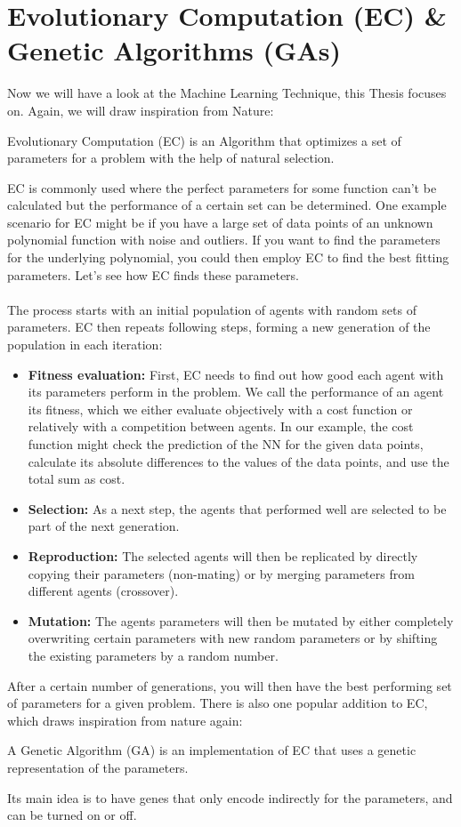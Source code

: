 \documentclass[11pt]{report}
\newcommand{\mydeflabel}{}
\newenvironment{mydef}[1]
 {\renewcommand\mydeflabel{#1}\begin{mydefinner}}
 {\end{mydefinner}}
\begin{document}
        \section{Evolutionary Computation (EC) \& Genetic Algorithms (GAs)}\label{sec:evolutionary-computation-(ec)-&-genetic-algorithms-(gas)}
    Now we will have a look at the Machine Learning Technique, this Thesis focuses on.
    Again, we will draw inspiration from Nature:
    \begin{mydef}{Evolutionary Computation}
    Evolutionary Computation (EC) is an Algorithm that optimizes a set of parameters for a problem with the help of natural selection.
    \end{mydef}
    EC is commonly used where the perfect parameters for some function can't be calculated but the performance of a certain set can be determined.
    One example scenario for EC might be if you have a large set of data points of an unknown polynomial function with noise and outliers.
    If you want to find the parameters for the underlying polynomial, you could then employ EC to find the best fitting parameters.
    Let's see how EC finds these parameters.
    \\ \\
    The process starts with an initial population of agents with random sets of parameters.
    EC then repeats following steps, forming a new generation of the population in each iteration:
    \begin{itemize}
        \item \textbf{Fitness evaluation:} First, EC needs to find out how good each agent with its parameters perform in the problem.
        We call the performance of an agent its fitness, which we either evaluate objectively with a cost function or relatively with a competition between agents.
        In our example, the cost function might check the prediction of the NN for the given data points, calculate its absolute differences to the values of the data points, and use the total sum as cost.
        \item \textbf{Selection:} As a next step, the agents that performed well are selected to be part of the next generation.
        \item \textbf{Reproduction:} The selected agents will then be replicated by directly copying their parameters (non-mating) or by merging parameters from different agents (crossover).
        \item \textbf{Mutation:} The agents parameters will then be mutated by either completely overwriting certain parameters with new random parameters or by shifting the existing parameters by a random number.
    \end{itemize}
    After a certain number of generations, you will then have the best performing set of parameters for a given problem.
    There is also one popular addition to EC, which draws inspiration from nature again:
    \begin{mydef}{Genetic Algorithm}
    A Genetic Algorithm (GA) is an implementation of EC that uses a genetic representation of the parameters.
    \end{mydef}
    Its main idea is to have genes that only encode indirectly for the parameters, and can be turned on or off.
\end{document}
